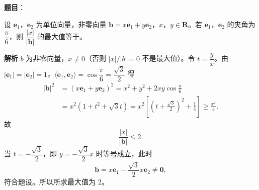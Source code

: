 \begin{answer}

\textbf{题目}：

设 $\boldsymbol e_1$，$\boldsymbol e_2$ 为单位向量，非零向量 $\boldsymbol b=x\boldsymbol e_1+y\boldsymbol e_2$，$x$，$y\in\mathbf R$。若 $\boldsymbol e_1$，$\boldsymbol e_2$ 的夹角为 $\dfrac\pi6$，则 $\dfrac{|x|}{|\boldsymbol b|}$ 的最大值等于\gkblank{}。

\textbf{解析}
$b$ 为非零向量，$x\neq0$（否则 $|x|/|b|=0$ 不是最大值）。令 $t=\dfrac yx$。由 $|\boldsymbol e_1|=|\boldsymbol e_2|=1$，$\langle\boldsymbol e_1,\boldsymbol e_2\rangle=\cos\dfrac\pi6=\dfrac{\sqrt3}2$ 得
\nopagebreak[4]
\[\begin{aligned}
|\boldsymbol b|^2&=(x\boldsymbol e_1+y\boldsymbol e_2)^2=x^2+y^2+2xy\cos\frac\pi6\\
&=x^2\left(1+t^2+\sqrt3t\right)
=x^2\left[\left(t+\frac{\sqrt3}2\right)^2+\frac14\right]\geqslant\frac{x^2}4.
\end{aligned}\]
故
\nopagebreak[4]
\[\frac{|x|}{|\boldsymbol b|}\leqslant2.\]
当 $t=-\dfrac{\sqrt3}2$，即 $y=-\dfrac{\sqrt3}2x$ 时等号成立，此时
\nopagebreak[4]
\[\boldsymbol b=x\boldsymbol e_1-\frac{\sqrt3}2x\boldsymbol e_2\neq\boldsymbol 0,\]
符合题设。所以所求最大值为 $2$。


\end{answer}
